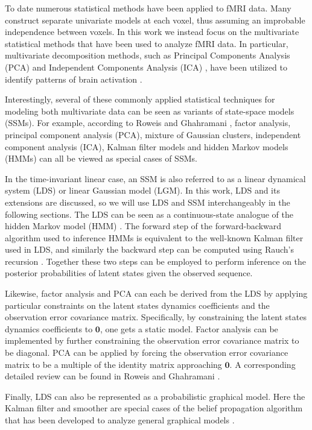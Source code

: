 \documentclass[fleqn]{article}
\begin{document}
To date numerous statistical methods have been applied to fMRI data. Many construct separate univariate models at each voxel, thus assuming an improbable independence between voxels. In this work we instead focus on the multivariate statistical methods that have been used to analyze fMRI data. In particular, multivariate decomposition methods, such as Principal Components Analysis (PCA) \cite{andersen1999principal} and Independent Components Analysis (ICA) \cite{calhoun2009review}, have been utilized to identify patterns of brain activation \cite{mckeown1998spatially}.

Interestingly, several of these commonly applied statistical techniques for modeling both multivariate data can be seen as variants of state-space models (SSMs). For example, according to Roweis and Ghahramani \cite{roweis1999unifying}, factor analysis, principal component analysis (PCA), mixture of Gaussian clusters, independent component analysis (ICA), Kalman filter models and hidden Markov models (HMMs) can all be viewed as special cases of SSMs.

In the time-invariant linear case, an SSM is also referred to as a linear dynamical system (LDS) or linear Gaussian model (LGM). In this work, LDS and its extensions are discussed, so we will use LDS and SSM interchangeably in the following sections. The LDS can be seen as a continuous-state analogue of the hidden Markov model (HMM) \cite{rabiner1986introduction}. The forward step of the forward-backward algorithm used to inference HMMs is equivalent to the well-known Kalman filter used in LDS, and similarly the backward step can be computed using Rauch’s recursion \cite{rauch1963solutions}. Together these two steps can be employed to perform inference on the posterior probabilities of latent states given the observed sequence.

Likewise, factor analysis and PCA can each be derived from the LDS by applying particular constraints on the latent states dynamics coefficients and the observation error covariance matrix. Specifically, by constraining the latent states dynamics coefficients to $\mathbf{0}$, one gets a static model. Factor analysis can be implemented by further constraining the observation error covariance matrix to be diagonal. PCA can be applied by forcing the observation error covariance matrix to be a multiple of the identity matrix approaching $\mathbf{0}$. A corresponding detailed review can be found in Roweis and Ghahramani \cite{roweis1999unifying}.

Finally, LDS can also be represented as a probabilistic graphical model. Here the Kalman filter and smoother are special cases of the belief propagation algorithm that has been developed to analyze general graphical models \cite{lauritzen1988local}\cite{pearl1988probabilistic}.
\end{document}
